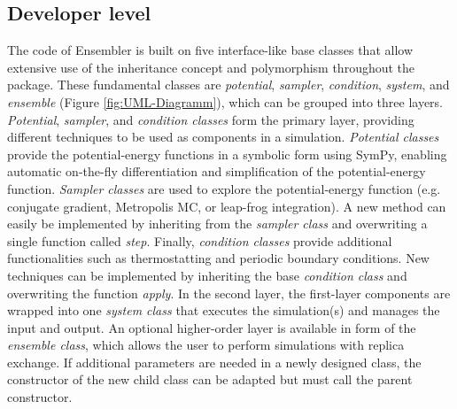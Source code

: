 \subsection{Developer level}
The code of Ensembler is built on five interface-like base classes that allow extensive use of the inheritance concept and polymorphism \cite{Stroustrup1995} throughout the package.
These fundamental classes are \textit{potential}, \textit{sampler}, \textit{condition}, \textit{system}, and \textit{ensemble} (Figure \ref{fig:UML-Diagramm}), which can be grouped into three layers.
\textit{Potential}, \textit{sampler}, and \textit{condition classes} form the primary layer, providing different techniques to be used as components in a simulation. 
\textit{Potential classes} provide the potential-energy functions in a symbolic form using SymPy,\cite{Meurer2017} enabling automatic on-the-fly differentiation and simplification of the potential-energy function. 
\textit{Sampler classes} are used to explore the potential-energy function (e.g. conjugate gradient,\cite{Hestenes1952} Metropolis MC,\cite{Hastings1970} or leap-frog\cite{Vangunsteren1988} integration). A new method can easily be implemented by inheriting from the \textit{sampler class} and overwriting a single function called \textit{step}. 
Finally, \textit{condition classes} provide additional functionalities such as thermostatting\cite{Andersen1980} and periodic boundary conditions\cite{Cheatham1995, Leach2001}. New techniques can be implemented by inheriting the base \textit{condition class} and overwriting the function \textit{apply}.
In the second layer, the first-layer components are wrapped into one \textit{system class} that executes the simulation(s) and manages the input and output. 
An optional higher-order layer is available in form of the \textit{ensemble class}, which allows the user to perform simulations with replica exchange.\cite{Sugita1999, Sugita2000, Yamauchi2017, Sidler2016}
If additional parameters are needed in a newly designed class, the constructor of the new child class can be adapted but must call the parent constructor.
